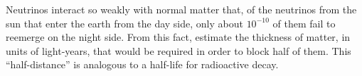 Neutrinos interact so weakly with normal matter that, of the neutrinos
from the sun that enter the earth from the day side, only about
$10^{-10}$ of them fail to reemerge on the night side. From this fact,
estimate the thickness of matter, in units of light-years,
that would be required in order to block half of them. This ``half-distance''
is analogous to a half-life for radioactive decay.
